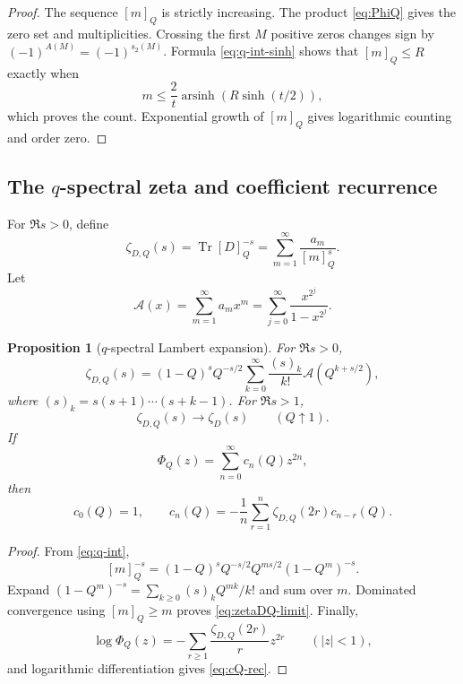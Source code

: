 \documentclass[11pt,oneside]{article}
\numberwithin{equation}{section}
\theoremstyle{plain}
\newtheorem{proposition}[theorem]{Proposition}
\theoremstyle{definition}
\theoremstyle{remark}
\newcommand{\Tr}{\operatorname{Tr}}
\newcommand{\arsinh}{\operatorname{arsinh}}
\newcommand{\Acal}{\mathcal A}
\begin{document}
\begin{proof}
The sequence $[m]_Q$ is strictly increasing.  The product \cref{eq:PhiQ} gives the zero set and multiplicities.  Crossing the first $M$ positive zeros changes sign by $(-1)^{A(M)}=(-1)^{s_2(M)}$.  Formula \cref{eq:q-int-sinh} shows that $[m]_Q\le R$ exactly when
\[
 m\le\frac2t\arsinh\!\left(R\sinh(t/2)\right),
\]
which proves the count.  Exponential growth of $[m]_Q$ gives logarithmic counting and order zero.
\end{proof}

\subsection{The $q$-spectral zeta and coefficient recurrence}

For $\Re s>0$, define
\begin{equation}\label{eq:zetaDQ}
 \zeta_{D,Q}(s)=\Tr[D]_Q^{-s}
 =\sum_{m=1}^{\infty}\frac{a_m}{[m]_Q^s}.
\end{equation}
Let
\begin{equation}\label{eq:A-lambert}
 \Acal(x)=\sum_{m=1}^{\infty}a_mx^m
 =\sum_{j=0}^{\infty}\frac{x^{2^j}}{1-x^{2^j}}.
\end{equation}

\begin{proposition}[$q$-spectral Lambert expansion]\label{prop:zetaDQ}
For $\Re s>0$,
\begin{equation}\label{eq:zetaDQ-Lambert}
 \boxed{\ \zeta_{D,Q}(s)
 =(1-Q)^sQ^{-s/2}
 \sum_{k=0}^{\infty}\frac{(s)_k}{k!}
 \Acal\!\left(Q^{k+s/2}\right),\ }
\end{equation}
where $(s)_k=s(s+1)\cdots(s+k-1)$.  For $\Re s>1$,
\begin{equation}\label{eq:zetaDQ-limit}
 \zeta_{D,Q}(s)\longrightarrow\zeta_D(s)
 \qquad(Q\uparrow1).
\end{equation}
If
\[
 \Phi_Q(z)=\sum_{n=0}^{\infty}c_n(Q)z^{2n},
\]
then
\begin{equation}\label{eq:cQ-rec}
 c_0(Q)=1,
 \qquad
 c_n(Q)=-\frac1n\sum_{r=1}^{n}
 \zeta_{D,Q}(2r)c_{n-r}(Q).
\end{equation}
\end{proposition}

\begin{proof}
From \cref{eq:q-int},
\[
 [m]_Q^{-s}=(1-Q)^sQ^{-s/2}
 Q^{ms/2}(1-Q^m)^{-s}.
\]
Expand $(1-Q^m)^{-s}=\sum_{k\ge0}(s)_kQ^{mk}/k!$ and sum over $m$.  Dominated convergence using $[m]_Q\ge m$ proves \cref{eq:zetaDQ-limit}.  Finally,
\[
 \log\Phi_Q(z)=-\sum_{r\ge1}\frac{\zeta_{D,Q}(2r)}r z^{2r}
 \qquad(|z|<1),
\]
and logarithmic differentiation gives \cref{eq:cQ-rec}.
\end{proof}
\end{document}
